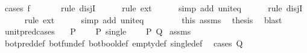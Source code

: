 \begin{isabellebody}
\ {\isacharparenleft}{\kern0pt}cases\ {\isachardoublequoteopen}f\ {\isacharparenleft}{\kern0pt}{\isacharparenright}{\kern0pt}{\isachardoublequoteclose}{\isacharparenright}{\kern0pt}\isanewline
\ \ \ \ \isamarkupfalse%
\ {\isacharparenleft}{\kern0pt}rule\ disjI{}{\isacharparenright}{\kern0pt}\isanewline
\ \ \ \ \isamarkupfalse%
\ {\isacharparenleft}{\kern0pt}rule\ ext{\isacharparenright}{\kern0pt}\isanewline
\ \ \ \ \isamarkupfalse%
\ {\isacharparenleft}{\kern0pt}simp\ add{\isacharcolon}{\kern0pt}\ unit{\isacharunderscore}{\kern0pt}eq{\isacharparenright}{\kern0pt}\isanewline
\ \ \ \ \isamarkupfalse%
\ {\isacharparenleft}{\kern0pt}rule\ disjI{}{\isacharparenright}{\kern0pt}\isanewline
\ \ \ \ \isamarkupfalse%
\ {\isacharparenleft}{\kern0pt}rule\ ext{\isacharparenright}{\kern0pt}\isanewline
\ \ \ \ \isamarkupfalse%
\ {\isacharparenleft}{\kern0pt}simp\ add{\isacharcolon}{\kern0pt}\ unit{\isacharunderscore}{\kern0pt}eq{\isacharparenright}{\kern0pt}\isanewline
\ \ \ \ \isamarkupfalse%
\isanewline
\ \ \isamarkupfalse%
\ this\ assms\ \isamarkupfalse%
\ {\isacharquery}{\kern0pt}thesis\ \isamarkupfalse%
\ blast\isanewline
{}\isamarkupfalse%
%
\endisatagproof
{\isafoldproof}%
%
\isadelimproof
\isanewline
%
\endisadelimproof
\isanewline
{}\isamarkupfalse%
\ unit{\isacharunderscore}{\kern0pt}pred{\isacharunderscore}{\kern0pt}cases{\isacharcolon}{\kern0pt}\isanewline
\ \ \ {\isachardoublequoteopen}P\ {\isasymbottom}{\isachardoublequoteclose}\isanewline
\ \ \ {\isachardoublequoteopen}P\ {\isacharparenleft}{\kern0pt}single\ {\isacharparenleft}{\kern0pt}{\isacharparenright}{\kern0pt}{\isacharparenright}{\kern0pt}{\isachardoublequoteclose}\isanewline
\ \ \ {\isachardoublequoteopen}P\ Q{\isachardoublequoteclose}\isanewline
%
\isadelimproof
%
\endisadelimproof
%
\isatagproof
{}\isamarkupfalse%
\ assms\ \isamarkupfalse%
\ bot{\isacharunderscore}{\kern0pt}pred{\isacharunderscore}{\kern0pt}def\ bot{\isacharunderscore}{\kern0pt}fun{\isacharunderscore}{\kern0pt}def\ bot{\isacharunderscore}{\kern0pt}bool{\isacharunderscore}{\kern0pt}def\ empty{\isacharunderscore}{\kern0pt}def\ single{\isacharunderscore}{\kern0pt}def\ \isamarkupfalse%
\ {\isacharparenleft}{\kern0pt}cases\ Q{\isacharparenright}{\kern0pt}\isanewline
\ \ \isamarkupfalse%

\end{isabellebody}
